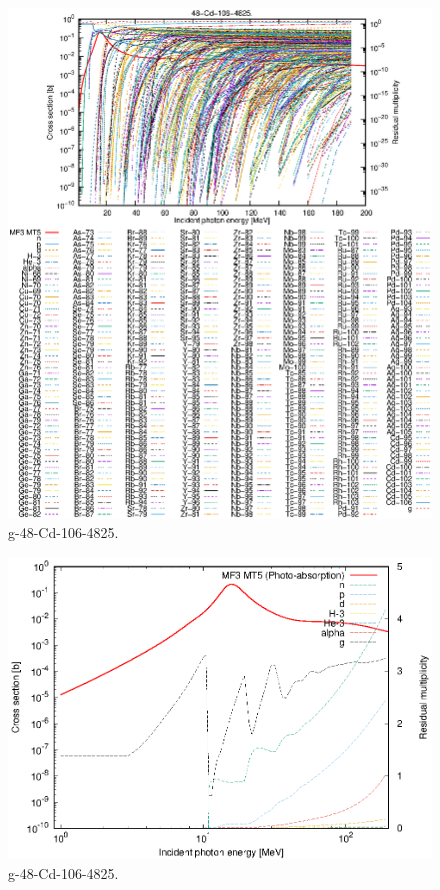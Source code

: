 \begin{figure}
 \includegraphics[width=\linewidth]{eps/g_48-Cd-106_4825.eps}
  \caption{g-48-Cd-106-4825.}
\end{figure}
\newpage \clearpage

\begin{figure}
 \includegraphics[width=\linewidth]{eps-log/g_48-Cd-106_4825.eps}
 \caption{g-48-Cd-106-4825.}
\end{figure}
\newpage \clearpage

